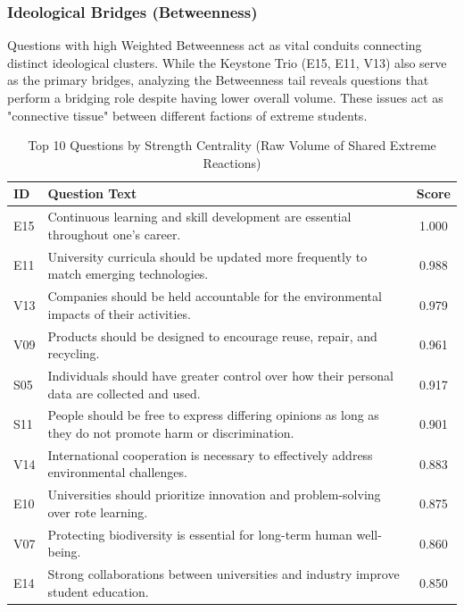 \documentclass[11pt, a4paper]{article}
\begin{document}
\subsubsection{Ideological Bridges (Betweenness)}
Questions with high Weighted Betweenness act as vital conduits connecting distinct ideological clusters. While the Keystone Trio (E15, E11, V13) also serve as the primary bridges, analyzing the Betweenness tail reveals questions that perform a bridging role despite having lower overall volume. These issues act as "connective tissue" between different factions of extreme students.

\vspace{0.5cm}

\begin{table}[H]
\centering
\caption{Top 10 Questions by Strength Centrality (Raw Volume of Shared Extreme Reactions)}
\label{tab:strength}
\renewcommand{\arraystretch}{1.2}
\begin{tabular}{l p{10cm} c}
\toprule
\textbf{ID} & \textbf{Question Text} & \textbf{Score} \\
\midrule
E15 & Continuous learning and skill development are essential throughout one's career. & 1.000 \\
E11 & University curricula should be updated more frequently to match emerging technologies. & 0.988 \\
V13 & Companies should be held accountable for the environmental impacts of their activities. & 0.979 \\
V09 & Products should be designed to encourage reuse, repair, and recycling. & 0.961 \\
S05 & Individuals should have greater control over how their personal data are collected and used. & 0.917 \\
S11 & People should be free to express differing opinions as long as they do not promote harm or discrimination. & 0.901 \\
V14 & International cooperation is necessary to effectively address environmental challenges. & 0.883 \\
E10 & Universities should prioritize innovation and problem-solving over rote learning. & 0.875 \\
V07 & Protecting biodiversity is essential for long-term human well-being. & 0.860 \\
E14 & Strong collaborations between universities and industry improve student education. & 0.850 \\
\bottomrule
\end{tabular}
\end{table}
\end{document}
